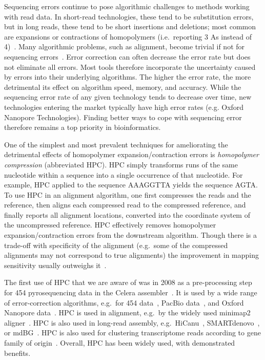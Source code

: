 \documentclass[
  11pt,
  twoside]{scrbook}
\begin{document}
Sequencing errors continue to pose algorithmic challenges to methods working
with read data. In short-read technologies, these tend to be substitution
errors, but in long reads, these tend to be short insertions and deletions; most
common are expansions or contractions of homopolymers (i.e.~reporting 3 As
instead of 4)~\autocite{dohmBenchmarkingLongreadCorrection2020}. Many algorithmic
problems, such as alignment, become trivial if not for sequencing
errors~\autocite{gusfieldAlgorithmsStringsTrees1997}. Error correction can often decrease the error rate but
does not eliminate all errors. Most tools therefore incorporate the uncertainty
caused by errors into their underlying algorithms. The higher the error rate,
the more detrimental its effect on algorithm speed, memory, and accuracy. While
the sequencing error rate of any given technology tends to decrease over time,
new technologies entering the market typically have high error rates (e.g.
Oxford Nanopore Technologies). Finding better ways to cope with sequencing error
therefore remains a top priority in bioinformatics.

One of the simplest and most prevalent techniques for ameliorating the
detrimental effects of homopolymer expansion/contraction errors is \emph{homopolymer
compression} (abbreviated HPC). HPC simply transforms runs of the same
nucleotide within a sequence into a single occurrence of that nucleotide. For
example, HPC applied to the sequence AAAGGTTA yields the sequence AGTA. To use
HPC in an alignment algorithm, one first compresses the reads and the reference,
then aligns each compressed read to the compressed reference, and finally
reports all alignment locations, converted into the coordinate system of the
uncompressed reference. HPC effectively removes homopolymer
expansion/contraction errors from the downstream algorithm. Though there is a
trade-off with specificity of the alignment (e.g.~some of the compressed
alignments may not correspond to true alignments) the improvement in mapping
sensitivity usually outweighs it~\autocite{liMinimap2PairwiseAlignment2018}.

The first use of HPC that we are aware of was in 2008 as a pre-processing step
for 454 pyrosequencing data in the Celera
assembler~\autocite{millerAggressiveAssemblyPyrosequencing2008}. It is used by a wide
range of error-correction algorithms, e.g.~for 454
data~\autocite{braggFastAccurateErrorcorrection2012}, PacBio
data~\autocite{auImprovingPacBioLong2012}, and Oxford Nanopore
data~\autocite{sahlinErrorCorrectionEnables2021}. HPC is used in alignment, e.g.~by the
widely used minimap2 aligner~\autocite{liMinimap2PairwiseAlignment2018}. HPC is also
used in long-read assembly, e.g.~HiCanu~\autocite{nurkHiCanuAccurateAssembly2020},
SMARTdenovo~\autocite{liuSMARTdenovoNovoAssembler2021}, or
mdBG~\autocite{ekimMinimizerspaceBruijnGraphs2021}. HPC is also used for clustering
transcriptome reads according to gene family of
origin~\autocite{sahlinNovoClusteringLongRead2020}. Overall, HPC has been widely used,
with demonstrated benefits.
\end{document}
